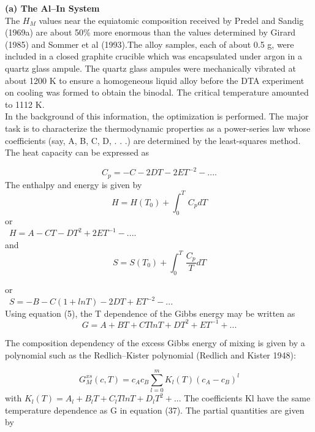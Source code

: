 \documentclass[12pt]{article}
\newcommand*{\1}{\hspace{1pt}}
\begin{document}
\textbf{(a) The Al–In System } \\

The $ H _M $ values near the equiatomic composition received by Predel and 
Sandig (1969a) are about 50\% more enormous than the values determined by 
Girard (1985) and Sommer et al (1993).The alloy samples, each of about 0.5 
g, were included in a closed graphite crucible which was encapsulated under 
argon in a quartz glass ampule. The quartz glass ampules were mechanically 
vibrated at about 1200 K to ensure a homogeneous liquid alloy before the DTA 
experiment on cooling was formed to obtain the binodal. The critical temperature 
amounted to 1112 K. \\
    In the background of this information, the optimization 
is performed. The major task is to characterize the thermodynamic properties 
as a power-series law whose coefficients
(say, A, B, C, D, . . .) are determined by the least-squares method. The 
heat capacity can be expressed as

    \begin{equation}
        C _p = -C - 2DT -2ET^{-2} - ....
    \end{equation}
The enthalpy and energy is given by\\

    \begin{equation}
        H = H(T _0) + \int_{0}^{T}  \,C _pdT
    \end{equation}
or\\
     \  $ H = A - CT -DT^{2} + 2ET^{-1} - .... $ \\
and
    \begin{equation}
        S = S(T_0) + \int_{0}^{T}  \,\frac{C _p}{T} dT 
    \end{equation}

or\\
\   $ S = -B -C(1 + lnT) - 2DT +ET^{-2} - ... $\\

Using equation (5), the T dependence of the Gibbs energy may be written as\\

    \begin{equation}
        G = A + BT + CT ln T +DT^2 + ET^{-1} + ... 
    \end{equation}

The composition dependency of the excess Gibbs energy of mixing 
is given by a polynomial such as the Redlich–Kister polynomial 
(Redlich and Kister 1948):

    \begin{equation}
        G^{xs}_M{(c, T)} = c _Ac _B\sum_{l = 0}^{m} K _l{(T)}(c_A - c _B)^l   
    \end{equation}
with $ K_l (T ) = A _l + B_l T + C_l T ln T + D_l T^{2} + ...$ The coefficients Kl have the same
temperature dependence as G in equation (37). The partial
 quantities are given by \\
\end{document}
